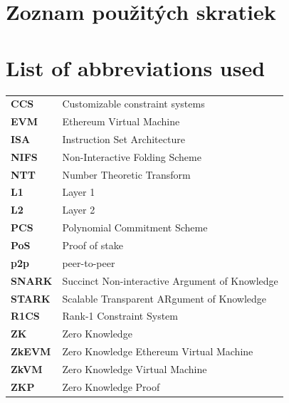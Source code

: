 \thispagestyle{plain}

\ifx\FIITlagEN\undefined
	\section*{\Huge Zoznam použitých skratiek}
\else
	\section*{\Huge List of abbreviations used}
\fi
\vskip 1cm

\begin{tabular}{ >{\bfseries}m{2cm} m{10cm} }
	CCS   & Customizable constraint systems                \\
	EVM   & Ethereum Virtual Machine                       \\
	ISA   & Instruction Set Architecture                   \\
	NIFS  & Non-Interactive Folding Scheme                 \\
	NTT   & Number Theoretic Transform                     \\
	L1    & Layer 1                                        \\
	L2    & Layer 2                                        \\
	PCS   & Polynomial Commitment Scheme                   \\
	PoS   & Proof of stake                                 \\
	p2p   & peer-to-peer                                   \\
	SNARK & Succinct Non-interactive Argument of Knowledge \\
	STARK & Scalable Transparent ARgument of Knowledge     \\
	R1CS  & Rank-1 Constraint System                       \\
	ZK    & Zero Knowledge                                 \\
	ZkEVM & Zero Knowledge Ethereum Virtual Machine        \\
	ZkVM  & Zero Knowledge Virtual Machine                 \\
	ZKP   & Zero Knowledge Proof
\end{tabular}

\emptypage
